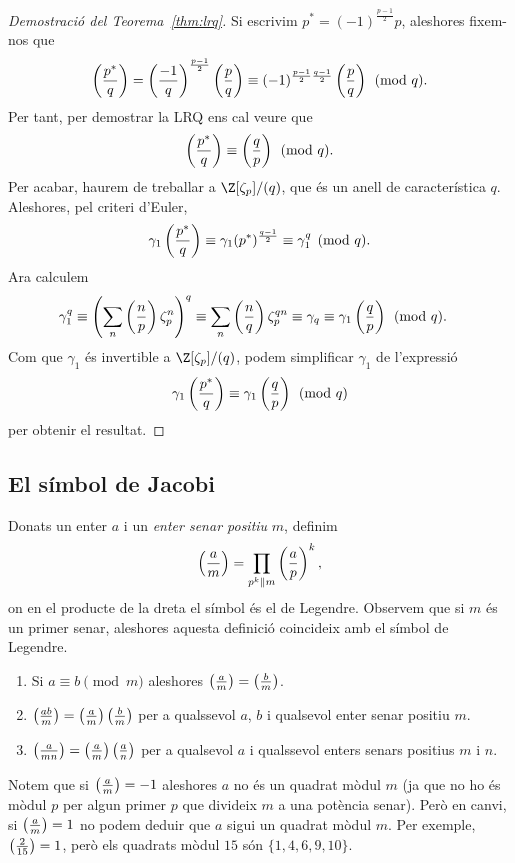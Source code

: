 \begin{proof}[Demostració del Teorema~\ref{thm:lrq}]
Si escrivim $p^*=(-1)^{\frac{p-1}{2}} p$, aleshores fixem-nos que
\[
\left(\frac{p^*}{q}\right) = \left(\frac{-1}{q}\right)^{\frac{p-1}{2}} \left(\frac{p}{q}\right) \equiv (-1)^{\frac{p-1}{2}\frac{q-1}{2}} \left(\frac{p}{q}\right) \pmod q.
\]
Per tant, per demostrar la LRQ ens cal veure que
\[
\left(\frac{p^*}{q}\right) \equiv \left(\frac{q}{p}\right) \pmod{q}.
\]
Per acabar, haurem de treballar a $\Z[\zeta_p]/(q)$, que és un anell de característica $q$. Aleshores, pel criteri d'Euler,
\[
\gamma_1\left(\frac{p^*}{q}\right)\equiv \gamma_1(p^*)^{\frac{q-1}{2}} \equiv \gamma_1^q\pmod{q}.
\]
Ara calculem
\begin{align*}
\gamma_1^q &\equiv \left(\sum_n \left(\frac{n}{p}\right)\zeta_p^n\right)^q \equiv \sum_n \left(\frac{n}{q}\right) \zeta_p^{qn} \equiv \gamma_q\equiv \gamma_1\left(\frac{q}{p}\right)\pmod{q}.
\end{align*}
Com que $\gamma_1$ és invertible a $\Z[\zeta_p]/(q)$, podem simplificar $\gamma_1$ de l'expressió
\[
\gamma_1\left(\frac{p^*}{q}\right)\equiv \gamma_1 \left(\frac{q}{p}\right)\pmod{q}
\]
per obtenir el resultat.

\end{proof}

\subsection{El símbol de Jacobi}
Donats un enter $a$ i un \emph{enter senar positiu} $m$, definim
\[
\left(\frac{a}{m}\right)=\prod_{p^k\parallel m} \left(\frac{a}{p}\right)^k,
\]
on en el producte de la dreta el símbol és el de Legendre. Observem que si $m$ és un primer senar, aleshores aquesta definició coincideix amb el símbol de Legendre.

\begin{lemma}
\begin{enumerate}
    \item Si $a\equiv b\pmod m$ aleshores $\left(\frac{a}{m}\right) = \left(\frac{b}{m}\right)$.
    \item $\left(\frac{ab}{m}\right)= \left(\frac{a}{m}\right) \left(\frac{b}{m}\right)$ per a qualssevol $a$, $b$ i qualsevol enter senar positiu $m$.
    \item $\left(\frac{a}{mn}\right) = \left(\frac{a}{m}\right) \left(\frac{a}{n}\right)$ per a qualsevol $a$ i qualssevol enters senars positius $m$ i $n$.
\end{enumerate}
\end{lemma}
\begin{remark}
 Notem que si $\left(\frac{a}{m}\right)=-1$ aleshores $a$ no és un quadrat mòdul $m$ (ja que no ho és mòdul $p$ per algun primer $p$ que divideix $m$ a una potència senar). Però en canvi, si $\left(\frac{a}{m}\right)=1$ no podem deduir que $a$ sigui un quadrat mòdul $m$. Per exemple, $\left(\frac{2}{15}\right) = 1$, però els quadrats mòdul $15$ són $\{1,4,6,9,10\}$.
\end{remark}

